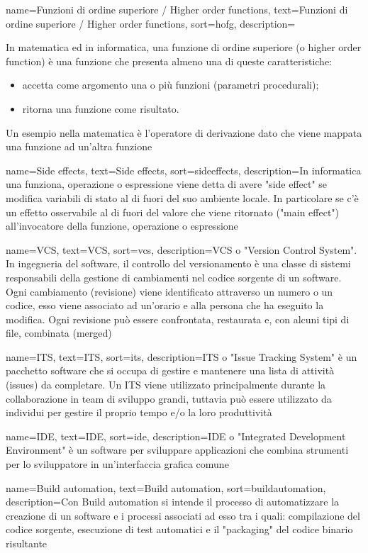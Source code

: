 {
	name=Funzioni di ordine superiore / Higher order functions,
	text=Funzioni di ordine superiore / Higher order functions,
	sort=hofg,
	description={
		In matematica ed in informatica, una funzione di ordine superiore (o higher order function) è una funzione che presenta almeno una di queste caratteristiche:
		\begin{itemize}
			\item accetta come argomento una o più funzioni (parametri procedurali);
			\item ritorna una funzione come risultato.
		\end{itemize}
		Un esempio nella matematica è l'operatore di derivazione dato che viene mappata una funzione ad un'altra funzione}
}

{
	name=Side effects,
	text=Side effects,
	sort=sideeffects,
	description={In informatica una funziona, operazione o espressione viene detta di avere "side effect" se modifica variabili di stato al di fuori del suo ambiente locale. In particolare se c'è un effetto osservabile al di fuori del valore che viene ritornato ("main effect") all'invocatore della funzione, operazione o espressione}
}

{
	name=VCS,
	text=VCS,
	sort=vcs,
	description={VCS o "Version Control System". In ingegneria del software, il controllo del versionamento è una classe di sistemi responsabili della gestione di cambiamenti nel codice sorgente di un software. Ogni cambiamento (revisione) viene identificato attraverso un numero o un codice, esso viene associato ad un'orario e alla persona che ha eseguito la modifica. Ogni revisione può essere confrontata, restaurata e, con alcuni tipi di file, combinata (merged)}
}

{
	name=ITS,
	text=ITS,
	sort=its,
	description={ITS o "Issue Tracking System" è un pacchetto software che si occupa di gestire e mantenere una lista di attività (issues) da completare. Un ITS viene utilizzato principalmente durante la collaborazione in team di sviluppo grandi, tuttavia può essere utilizzato da individui per gestire il proprio tempo e/o la loro produttività}
}

{
	name=IDE,
	text=IDE,
	sort=ide,
	description={IDE o "Integrated Development Environment" è un software per sviluppare applicazioni che combina strumenti per lo sviluppatore in un'interfaccia grafica comune}
}

{
	name=Build automation,
	text=Build automation,
	sort=buildautomation,
	description={Con Build automation si intende il processo di automatizzare la creazione di un software e i processi associati ad esso tra i quali: compilazione del codice sorgente, esecuzione di test automatici e il "packaging" del codice binario risultante}
}

